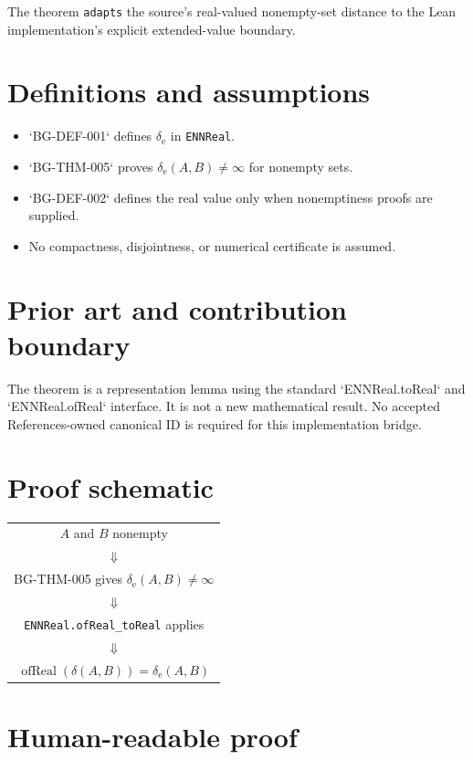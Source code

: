 \documentclass[11pt]{article}
\begin{document}
The theorem \texttt{adapts} the source's real-valued nonempty-set distance to the Lean
implementation's explicit extended-value boundary.

\section{Definitions and assumptions}

\begin{itemize}
 \item `BG-DEF-001` defines $\delta_{\mathrm e}$ in \texttt{ENNReal}.
 \item `BG-THM-005` proves $\delta_{\mathrm e}(A,B)\ne\infty$ for nonempty sets.
 \item `BG-DEF-002` defines the real value only when nonemptiness proofs are supplied.
 \item No compactness, disjointness, or numerical certificate is assumed.
\end{itemize}

\section{Prior art and contribution boundary}

The theorem is a representation lemma using the standard `ENNReal.toReal` and
`ENNReal.ofReal` interface. It is not a new mathematical result. No accepted
References-owned canonical ID is required for this implementation bridge.

\section{Proof schematic}

\begin{center}
\begin{tabular}{c}
$A$ and $B$ nonempty \\
$\Downarrow$ \\
BG-THM-005 gives $\delta_{\mathrm e}(A,B)\ne\infty$ \\
$\Downarrow$ \\
\texttt{ENNReal.ofReal\_toReal} applies \\
$\Downarrow$ \\
$\operatorname{ofReal}(\delta(A,B))=\delta_{\mathrm e}(A,B)$
\end{tabular}
\end{center}

\section{Human-readable proof}
\end{document}
